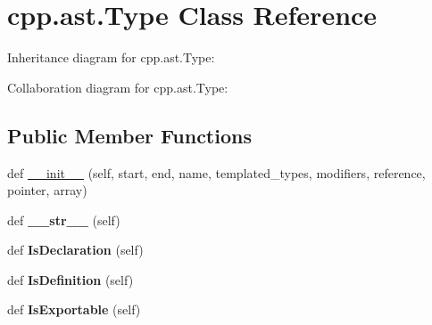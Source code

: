 \hypertarget{classcpp_1_1ast_1_1Type}{}\section{cpp.\+ast.\+Type Class Reference}
\label{classcpp_1_1ast_1_1Type}


Inheritance diagram for cpp.\+ast.\+Type\+:


Collaboration diagram for cpp.\+ast.\+Type\+:
\subsection*{Public Member Functions}
\begin{DoxyCompactItemize}
\item 
def \hyperlink{classcpp_1_1ast_1_1Type_adc20d88db721b5d7b513c08a4d6753c9}{\+\_\+\+\_\+init\+\_\+\+\_\+} (self, start, end, name, templated\+\_\+types, modifiers, reference, pointer, array)
\item 
\mbox{\label{classcpp_1_1ast_1_1Type_a1a10eff21f6150b7e14bde3788fa069b}} 
def {\bfseries \+\_\+\+\_\+str\+\_\+\+\_\+} (self)
\item 
\mbox{\label{classcpp_1_1ast_1_1Type_a590071a2bce7ea5140d7eb86c90f63bf}} 
def {\bfseries Is\+Declaration} (self)
\item 
\mbox{\label{classcpp_1_1ast_1_1Type_aedff25dc3736e83388742e55fe29159b}} 
def {\bfseries Is\+Definition} (self)
\item 
\mbox{\label{classcpp_1_1ast_1_1Type_a80dce781581c03e550ce51a9a33ca158}} 
def {\bfseries Is\+Exportable} (self)
\end{DoxyCompactItemize}
